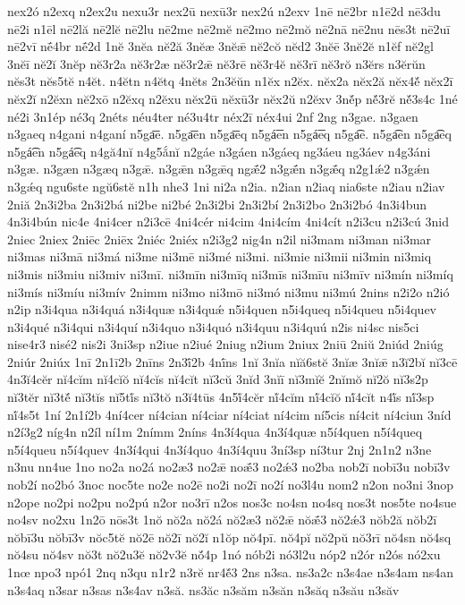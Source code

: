 {nex2ó
n2exq
n2ex2u
nexu3r
nex2ū
nexū3r
nex2ú
n2exv
1nē
nē2br
n1ē2d
nē3du
nē2i
n1ēl
nē2lă
nē2lĕ
nē2lu
nē2me
nē2mĕ
nē2mo
nē2mŏ
nē2nā
nē2nu
nēs3t
nē2uī
nē2vī
nḗ4br
nḗ2d
1nĕ
3nĕa
nĕ2ă
3nĕæ
3nĕǣ
nĕ2cŏ
nĕd2
3nĕē
3nĕ2ĕ
n1ĕf
nĕ2gl
3nĕī
nĕ2ĭ
3nĕp
nĕ3r2a
nĕ3r2æ
nĕ3r2ǣ
nĕ3rē
nĕ3r4ĕ
nĕ3rī
nĕ3rŏ
n3ĕrs
n3ĕrŭn
nĕs3t
nĕs5tĕ
n4ĕt.
n4ĕtn
n4ĕtq
4nĕts
2n3ĕŭn
n1ĕx
n2ĕx.
nĕx2a
nĕx2ă
nĕx4ĕ́
nĕx2ī
nĕx2ĭ
n2ĕxn
nĕ2xō
n2ĕxq
n2ĕxu
nĕx2ū
nĕxū3r
nĕx2ŭ
n2ĕxv
3nĕ́p
nĕ́3rĕ
nĕ́3s4c
1né
né2i
3n1ép
né3q
2néts
néu4ter
né3u4tr
néx2ī
néx4ui
2nf
2ng
n3gae.
n3gaen
n3gaeq
n4gani
n4ganí
n5ga͞e.
n5ga͞en
n5ga͞eq
n5gá͞en
n5gá͞eq
n5ga͡e.
n5ga͡en
n5ga͡eq
n5gá͡en
n5gá͡eq
n4gă4nĭ
n4g5ắnĭ
n2gáe
n3gáen
n3gáeq
ng3áeu
ng3áev
n4g3áni
n3gæ.
n3gæn
n3gæq
n3gǣ.
n3gǣn
n3gǣq
ngǣ́2
n3gǣ́n
n3gǣ́q
n2g1ǽ2
n3gǽn
n3gǽq
ngu6ste
ngŭ6stĕ
n1h
nhe3
1ni
ni2a
n2ia.
n2ian
n2iaq
nia6ste
n2iau
n2iav
2niă
2n3i2ba
2n3i2bá
ni2be
ni2bé
2n3i2bi
2n3i2bí
2n3i2bo
2n3i2bó
4n3i4bun
4n3i4bún
nic4e
4ni4cer
n2i3cē
4ni4cér
ni4cim
4ni4cím
4ni4cít
n2i3cu
n2i3cú
3nid
2niec
2niex
2niēc
2niēx
2niéc
2niéx
n2i3g2
nig4n
n2il
ni3mam
ni3man
ni3mar
ni3mas
ni3mā
ni3má
ni3me
ni3mē
ni3mé
ni3mi.
ni3mie
ni3mii
ni3min
ni3miq
ni3mis
ni3miu
ni3miv
ni3mī.
ni3mīn
ni3mīq
ni3mīs
ni3mīu
ni3mīv
ni3mín
ni3míq
ni3mís
ni3míu
ni3mív
2nimm
ni3mo
ni3mō
ni3mó
ni3mu
ni3mú
2nins
n2i2o
n2ió
n2ip
n3i4qua
n3i4quá
n3i4quæ
n3i4quǽ
n5i4quen
n5i4queq
n5i4queu
n5i4quev
n3i4qué
n3i4qui
n3i4quí
n3i4quo
n3i4quó
n3i4quu
n3i4quú
n2is
ni4sc
nis5ci
nise4r3
nisé2
nis2i
3ni3sp
n2iue
n2iué
2niug
n2ium
2niux
2niū
2niŭ
2niúd
2niúg
2niúr
2niúx
1nī
2n1ī2b
2nīns
2n3ī́2b
4nī́ns
1nĭ
3nĭa
nĭă6stĕ
3nĭæ
3nĭǣ
n3ĭ2bĭ
nĭ3cē
4n3ĭ4cĕr
nĭ4cĭm
nĭ4cĭŏ
nĭ4cĭs
nĭ4cĭt
nĭ3cŭ
3nĭd
3nĭī
nĭ3mĭĕ
2nĭmŏ
nĭ2ŏ
nĭ3s2p
nĭ3tĕr
nĭ3tĕ́
nĭ3tĭs
nĭ5tĭ́s
nĭ3tŏ
n3ĭ4tūs
4n5ĭ́4cĕr
nĭ́4cĭm
nĭ́4cĭŏ
nĭ́4cĭt
n4ĭ́s
nĭ́3sp
nĭ́4s5t
1ní
2n1í2b
4ní4cer
ní4cian
ní4ciar
ní4ciat
ní4cim
ní5cis
ní4cit
ní4ciun
3níd
n2í3g2
níg4n
n2íl
ní1m
2nímm
2níns
4n3í4qua
4n3í4quæ
n5í4quen
n5í4queq
n5í4queu
n5í4quev
4n3í4qui
4n3í4quo
4n3í4quu
3ní3sp
ní3tur
2nj
2n1n2
n3ne
n3nu
nn4ue
1no
no2a
no2á
no2æ3
no2ǣ
noǣ́3
no2ǽ3
no2ba
nob2ī
nobī3u
nobī3v
nob2í
no2bó
3noc
noc5te
no2e
no2ē
no2i
no2ī
no2í
no3l4u
nom2
n2on
no3ni
3nop
n2ope
no2pi
no2pu
no2pú
n2or
no3rī
n2os
nos3c
no4sn
no4sq
nos3t
nos5te
no4sue
no4sv
no2xu
1n2ō
nōs3t
1nŏ
nŏ2a
nŏ2á
nŏ2æ3
nŏ2ǣ
nŏǣ́3
nŏ2ǽ3
nŏb2ă
nŏb2ī
nŏbī3u
nŏbī3v
nŏc5tĕ
nŏ2ē
nŏ2ī
nŏ2ĭ
n1ŏp
nŏ4pī.
nŏ4pĭ
nŏ2pŭ
nŏ3rī
nŏ4sn
nŏ4sq
nŏ4su
nŏ4sv
nŏ3t
nŏ2u3ĕ
nŏ2v3ĕ
nŏ́4p
1nó
nób2i
nó3l2u
nóp2
n2ór
n2ós
nó2xu
1nœ
npo3
npó1
2nq
n3qu
n1r2
n3rĕ
nr4ĕ́3
2ns
n3sa.
ns3a2c
n3s4ae
n3s4am
ns4an
n3s4aq
n3sar
n3sas
n3s4av
n3să.
ns3ăc
n3săm
n3săn
n3săq
n3său
n3săv
}
